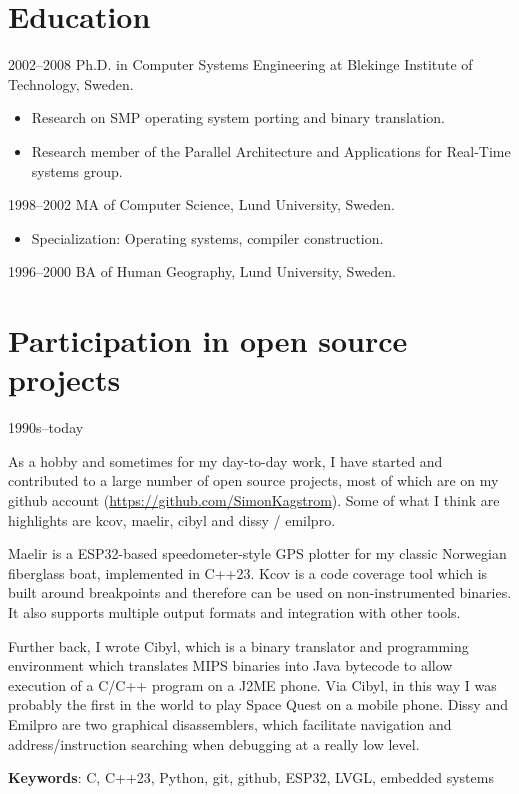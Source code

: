 \documentclass[a4paper]{article}
\begin{document}
\section{Education}

\begin{CV}
\item[2002--2008] Ph.D. in Computer Systems Engineering at Blekinge Institute of Technology,
  Sweden.

  \begin{itemize}
  \item Research on SMP operating system porting and binary translation.
  \item Research member of the Parallel Architecture and Applications for
    Real-Time systems group.
  \end{itemize}

\item[1998--2002] MA of Computer Science, Lund University, Sweden.
  \begin{itemize}
  \item Specialization: Operating systems, compiler construction.
  \end{itemize}

\item[1996--2000] BA of Human Geography, Lund University, Sweden.

\end{CV}

\section{Participation in open source projects}

\begin{CV}

\item[1990s--today]

As a hobby and sometimes for my day-to-day work, I have started and contributed to a
large number of open source projects, most of which are on my github account
(\url{https://github.com/SimonKagstrom}). Some of what I think are highlights are kcov,
maelir, cibyl and dissy / emilpro.

Maelir is a ESP32-based speedometer-style GPS plotter for my classic Norwegian fiberglass
boat, implemented in C++23. Kcov is a code coverage tool which is built around breakpoints
and therefore can be used on non-instrumented binaries. It also supports multiple output
formats and integration with other tools. 

Further back, I wrote Cibyl, which is a binary translator and programming environment
which translates MIPS binaries into Java bytecode to allow execution of a C/C++ program
on a J2ME phone. Via Cibyl, in this way I was probably the first in the world to play
Space Quest on a mobile phone. Dissy and Emilpro are two graphical disassemblers, which
facilitate navigation and address/instruction searching when debugging at a really
low level.

\textbf{Keywords}: C, C++23, Python, git, github, ESP32, LVGL, embedded systems
\end{CV}
\end{document}
